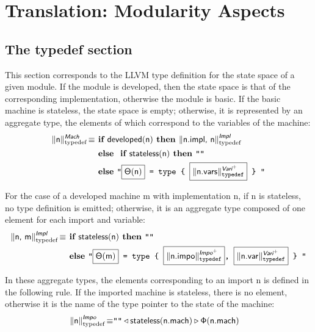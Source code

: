 \documentclass{article}
\newcommand{\trad}[2]{\ensuremath{\lVert \textsf{#1} \rVert^{\textit{#2}}}}
\DeclareMathOperator{\isdef}{\equiv}
\newcommand{\llvm}[1]{\texttt{#1}}
\newcommand{\B}[1]{\textsf{#1}}
\newcommand{\ListOf}[1]{$\mbox{#1}^+$}
\newcommand{\IF}[0]{\textbf{ if }}
\newcommand{\ELSE}[0]{\textbf{ else }}
\newcommand{\THEN}[0]{\textbf{ then }}
\newcommand{\PH}[1]{\framebox{$#1$}}
\newcommand{\developed}[0]{\ensuremath{\textsf{developed}}}
\newcommand{\stateless}[0]{\ensuremath{\textsf{stateless}}}
\newcommand{\state}[0]{\ensuremath{\sf\Theta}}
\newcommand{\stateref}[0]{\ensuremath{\sf\Phi}}
\begin{document}
\section{Translation: Modularity Aspects}
\label{sec:module}

\subsection{The typedef section}

This section corresponds to the LLVM type definition for the state space of a
given module. If the module is developed, then the state space is that of the
corresponding implementation, otherwise the module is basic. If the basic
machine is stateless, the state space is empty; otherwise, it is represented by
an aggregate type, the elements of which correspond to the variables of the
machine:
\begin{align*}
  \trad{\B{n}}{\B{Mach}}_{\text{typedef}} \isdef
  & \IF \developed(\B{n}) \THEN \trad{\B{n.impl}, \B{n}}{\B{Impl}}_{\text{typedef}} \\
  & \ELSE \IF \stateless(\B{n}) \THEN \llvm{""} \\
  & \ELSE \llvm{"\PH{\state(\B{n})} = type \{ \PH{\trad{\B{n.vars}}{\ListOf{\B{Vari}}}_{\text{typedef}}} \} "}
\end{align*}

For the case of a developed machine \B{m} with implementation \B{n}, if \B{n} is
stateless, no type definition is emitted; otherwise, it is an aggregate type
composed of one element for each import and variable:
\begin{align*}
  \trad{\B{n}, \B{m}}{\B{Impl}}_{\text{typedef}} \isdef
  & \IF \stateless(\B{n}) \THEN \llvm{""} \\
  & \ELSE \llvm{"\PH{\state(\B{m})} = type \{ \PH{\trad{\B{n.impo}}{\ListOf{\B{Impo}}}_{\text{typedef}}}, \PH{\trad{\B{n.var}}{\ListOf{\B{Vari}}}_{\text{typedef}}} \} "}
\end{align*}

In these aggregate types, the elements corresponding to an import \B{n} is
defined in the following rule. If the imported machine is stateless, there is no
element, otherwise it is the name of the type pointer to the state of the
machine:
\begin{align*}
  \trad{\B{n}}{\B{Impo}}_{\text{typedef}} \isdef
  & \llvm{""} \triangleleft \stateless(\B{n.mach}) \triangleright \stateref(\B{n.mach})
\end{align*}
\end{document}
